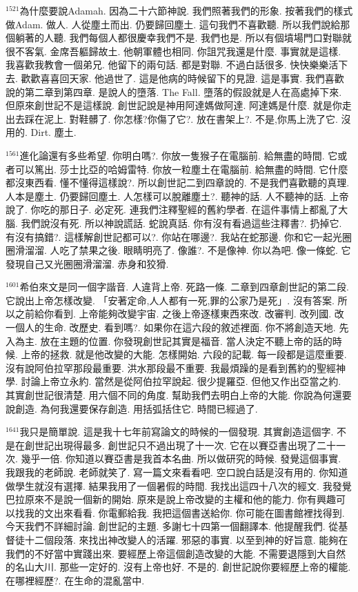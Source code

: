 \documentclass{book}
\begin{document}
$^{1521}$為什麼要說Adamah.
因為二十六節神說.
我們照著我們的形象.
按著我們的樣式做Adam.
做人.
人從塵土而出.
仍要歸回塵土.
這句我們不喜歡聽.
所以我們說給那個躺著的人聽.
我們每個人都很慶幸我們不是.
我們也是.
所以有個墳場門口對聯就很不客氣.
金席吾軀歸故土.
他朝軍體也相同.
你詛咒我還是什麼.
事實就是這樣.
我喜歡我教會一個弟兄.
他留下的兩句話.
都是對聯.
不過白話很多.
快快樂樂活下去.
歡歡喜喜回天家.
他過世了.
這是他病的時候留下的見證.
這是事實.
我們喜歡說的第二章到第四章.
是說人的墮落.
The Fall.
墮落的假設就是人在高處掉下來.
但原來創世記不是這樣說.
創世記說是神用阿達媽做阿達.
阿達媽是什麼.
就是你走出去踩在泥上.
對鞋髒了.
你怎樣?你傷了它?.
放在書架上?.
不是,你馬上洗了它.
沒用的.
Dirt.
塵土.

$^{1561}$進化論還有多些希望.
你明白嗎?.
你放一隻猴子在電腦前.
給無盡的時間.
它或者可以篤出.
莎士比亞的哈姆雷特.
你放一粒塵土在電腦前.
給無盡的時間.
它什麼都沒東西看.
懂不懂得這樣說?.
所以創世記二到四章說的.
不是我們喜歡聽的真理.
人本是塵土.
仍要歸回塵土.
人怎樣可以脫離塵土?.
聽神的話.
人不聽神的話.
上帝說了.
你吃的那日子.
必定死.
連我們注釋聖經的舊約學者.
在這件事情上都亂了大腦.
我們說沒有死.
所以神說謊話.
蛇說真話.
你有沒有看過這些注釋書?.
扔掉它.
有沒有搞錯?.
這樣解創世記都可以?.
你站在哪邊?.
我站在蛇那邊.
你和它一起光圈圈滑溜溜.
人吃了禁果之後.
眼睛明亮了.
像誰?.
不是像神.
你以為吧.
像一條蛇.
它發現自己又光圈圈滑溜溜.
赤身和狡猾.

$^{1601}$希伯來文是同一個字諧音.
人違背上帝.
死路一條.
二章到四章創世記的第二段.
它說出上帝怎樣改變.
「安著定命,人人都有一死,罪的公家乃是死」.
沒有答案.
所以之前給你看到.
上帝能夠改變宇宙.
之後上帝逐樣東西來改.
改審判.
改列國.
改一個人的生命.
改歷史.
看到嗎?.
如果你在這六段的敘述裡面.
你不將創造天地.
先入為主.
放在主題的位置.
你發現創世記其實是福音.
當人決定不聽上帝的話的時候.
上帝的拯救.
就是他改變的大能.
怎樣開始.
六段的記載.
每一段都是這麼重要.
沒有說阿伯拉罕那段最重要.
洪水那段最不重要.
我最煩躁的是看到舊約的聖經神學.
討論上帝立永約.
當然是從阿伯拉罕說起.
很少提羅亞.
但他又作出亞當之約.
其實創世記很清楚.
用六個不同的角度.
幫助我們去明白上帝的大能.
你說為何還要說創造.
為何我還要保存創造.
用括弧括住它.
時間已經過了.

$^{1641}$我只是簡單說.
這是我十七年前寫論文的時候的一個發現.
其實創造這個字.
不是在創世記出現得最多.
創世記只不過出現了十一次.
它在以賽亞書出現了二十一次.
幾乎一倍.
你知道以賽亞書是我首本名曲.
所以做研究的時候.
發覺這個事實.
我跟我的老師說.
老師就笑了.
寫一篇文來看看吧.
空口說白話是沒有用的.
你知道做學生就沒有選擇.
結果我用了一個暑假的時間.
我找出這四十八次的經文.
我發覺巴拉原來不是說一個新的開始.
原來是說上帝改變的主權和他的能力.
你有興趣可以找我的文出來看看.
你電郵給我.
我把這個書送給你.
你可能在圖書館裡找得到.
今天我們不詳細討論.
創世記的主題.
多謝七十四第一個翻譯本.
他提醒我們.
從基督徒十二個段落.
來找出神改變人的活躍.
邪惡的事實.
以至到神的好旨意.
能夠在我們的不好當中實踐出來.
要經歷上帝這個創造改變的大能.
不需要退隱到大自然的名山大川.
那些一定好的.
沒有上帝也好.
不是的.
創世記說你要經歷上帝的權能.
在哪裡經歷?.
在生命的混亂當中.
\end{document}
